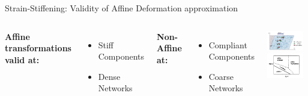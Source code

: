 \documentclass[10pt]{beamer}
\begin{document}
\begin{frame}[t]{Strain-Stiffening: Validity of Affine Deformation approximation}
    \begin{center} \citep{wilhelm_elasticity_2003} \citep{onck_alternative_2005} \end{center}
    \begin{columns}[T,onlytextwidth]
        \textbf{Affine transformations valid at:}
        \begin{itemize}
            \item Stiff Components
            \item Dense Networks
        \end{itemize}
        \textbf{Non-Affine at:}
        \begin{itemize}
            \item Compliant Components
            \item Coarse Networks
        \end{itemize}
        \includegraphics[width=0.9\textwidth]{./Figures/nonaffine.png}
        \newline
        \citep{wen_non-affine_2012,basu_nonaffine_2011}
        \newline
        \includegraphics[width=0.9\textwidth]{./Figures/nonaffine-head.png}
        \newline
        \citep{head_mechanical_2005}
    \end{columns}
\end{frame}
\end{document}
